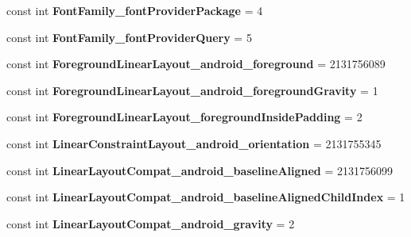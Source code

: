 \begin{DoxyCompactItemize}
const int {\bfseries Font\+Family\+\_\+font\+Provider\+Package} = 4
\item 
\mbox{\label{classst_delivery_1_1_resource_1_1_styleable_a0090ef027f6f0d8d8b9d7583cc6e06d7}} 
const int {\bfseries Font\+Family\+\_\+font\+Provider\+Query} = 5
\item 
\mbox{\label{classst_delivery_1_1_resource_1_1_styleable_a49fe9bc77a68cecda5b5055e1270aa3c}} 
const int {\bfseries Foreground\+Linear\+Layout\+\_\+android\+\_\+foreground} = 2131756089
\item 
\mbox{\label{classst_delivery_1_1_resource_1_1_styleable_aa005f1491ec3553c477a36f6a9ea6fa2}} 
const int {\bfseries Foreground\+Linear\+Layout\+\_\+android\+\_\+foreground\+Gravity} = 1
\item 
\mbox{\label{classst_delivery_1_1_resource_1_1_styleable_a374c44c4965ad86f51769b36decf6d46}} 
const int {\bfseries Foreground\+Linear\+Layout\+\_\+foreground\+Inside\+Padding} = 2
\item 
\mbox{\label{classst_delivery_1_1_resource_1_1_styleable_aec99e2eff1659263318c18e571aa67f1}} 
const int {\bfseries Linear\+Constraint\+Layout\+\_\+android\+\_\+orientation} = 2131755345
\item 
\mbox{\label{classst_delivery_1_1_resource_1_1_styleable_a2726abf599dc755d6484c61a7cbb4c3c}} 
const int {\bfseries Linear\+Layout\+Compat\+\_\+android\+\_\+baseline\+Aligned} = 2131756099
\item 
\mbox{\label{classst_delivery_1_1_resource_1_1_styleable_a5c96b91d2094a3f955ad4c21b81bc307}} 
const int {\bfseries Linear\+Layout\+Compat\+\_\+android\+\_\+baseline\+Aligned\+Child\+Index} = 1
\item 
\mbox{\label{classst_delivery_1_1_resource_1_1_styleable_a3dca0a577b27a1929d2c2c432a025672}} 
const int {\bfseries Linear\+Layout\+Compat\+\_\+android\+\_\+gravity} = 2

\end{DoxyCompactItemize}
